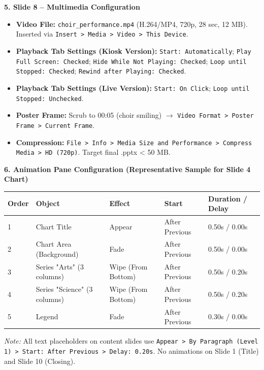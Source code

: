 \documentclass[11pt]{article}
\begin{document}
\textbf{5. Slide 8 -- Multimedia Configuration}
\begin{itemize}
    \item \textbf{Video File:} \texttt{choir\_performance.mp4} (H.264/MP4, 720p, 28 sec, 12 MB). Inserted via \texttt{Insert > Media > Video > This Device}.
    \item \textbf{Playback Tab Settings (Kiosk Version):} \texttt{Start: Automatically}; \texttt{Play Full Screen: Checked}; \texttt{Hide While Not Playing: Checked}; \texttt{Loop until Stopped: Checked}; \texttt{Rewind after Playing: Checked}.
    \item \textbf{Playback Tab Settings (Live Version):} \texttt{Start: On Click}; \texttt{Loop until Stopped: Unchecked}.
    \item \textbf{Poster Frame:} Scrub to 00:05 (choir smiling) $\rightarrow$ \texttt{Video Format > Poster Frame > Current Frame}.
    \item \textbf{Compression:} \texttt{File > Info > Media Size and Performance > Compress Media > HD (720p)}. Target final .pptx < 50 MB.
\end{itemize}

\textbf{6. Animation Pane Configuration (Representative Sample for Slide 4 Chart)}
\begin{center}
\begin{tabular}{|l|l|l|l|l|}\hline
\rowcolor{popblueL} \textbf{Order} & \textbf{Object} & \textbf{Effect} & \textbf{Start} & \textbf{Duration / Delay} \\ \hline
1 & Chart Title & Appear & After Previous & 0.50s / 0.00s \\ \hline
2 & Chart Area (Background) & Fade & After Previous & 0.50s / 0.00s \\ \hline
3 & Series "Arts" (3 columns) & Wipe (From Bottom) & After Previous & 0.50s / 0.20s \\ \hline
4 & Series "Science" (3 columns) & Wipe (From Bottom) & After Previous & 0.50s / 0.20s \\ \hline
5 & Legend & Fade & After Previous & 0.30s / 0.00s \\ \hline
\end{tabular}
\end{center}
\textit{Note:} All text placeholders on content slides use \texttt{Appear > By Paragraph (Level 1) > Start: After Previous > Delay: 0.20s}. No animations on Slide 1 (Title) and Slide 10 (Closing).
\end{document}
